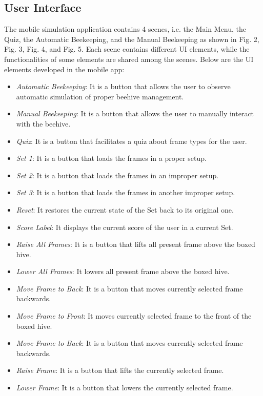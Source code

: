 \documentclass[journal]{./IEEE/IEEEtran}
\begin{document}
\subsection{User Interface}
\indent
The mobile simulation application contains 4 scenes, i.e. the Main Menu, the Quiz, the Automatic Beekeeping, and the Manual Beekeeping as shown in Fig. 2, Fig. 3, Fig. 4, and Fig. 5. Each scene contains different UI elements, while the functionalities of some elements are shared among the scenes. Below are the UI elements developed in the mobile app:
\begin{itemize}
    \item \textit{Automatic Beekeeping}: It is a button that allows the user to observe automatic simulation of proper beehive management.
    \item \textit{Manual Beekeeping}: It is a button that allows the user to manually interact with the beehive.
    \item \textit{Quiz}: It is a button that facilitates a quiz about frame types for the user.
    \item \textit{Set 1}: It is a button that loads the frames in a proper setup.
    \item \textit{Set 2}: It is a button that loads the frames in an improper setup.
    \item \textit{Set 3}: It is a button that loads the frames in another improper setup.
    \item \textit{Reset}: It restores the current state of the Set back to its original one.
    \item \textit{Score Label}: It displays the current score of the user in a current Set.
    \item \textit{Raise All Frames}: It is a button that lifts all present frame above the boxed hive.
    \item \textit{Lower All Frames}: It lowers all present frame above the boxed hive.
    \item \textit{Move Frame to Back}: It is a button that moves currently selected frame backwards.
    \item \textit{Move Frame to Front}: It moves currently selected frame to the front of the boxed hive.
    \item \textit{Move Frame to Back}: It is a button that moves currently selected frame backwards.
    \item \textit{Raise Frame}: It is a button that lifts the currently selected frame.
    \item \textit{Lower Frame}: It is a button that lowers the currently selected frame.

\end{itemize}
\end{document}
